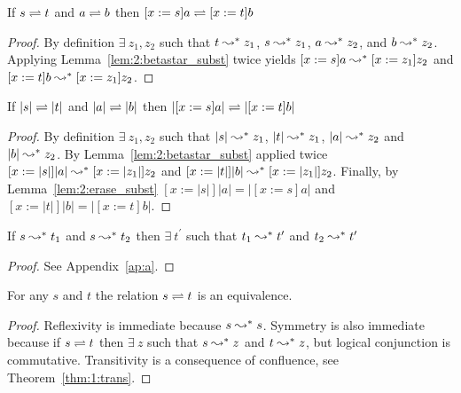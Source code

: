 \begin{lemma}
    If $s \rightleftharpoons t$ and $a \rightleftharpoons b$ then $[x := s]a \rightleftharpoons [x := t]b$
    \label{lem:2:betaconv_subst}
\end{lemma}
\begin{proof}
    By definition $\exists\ z_1, z_2$ such that $t \leadsto^* z_1$, $s \leadsto^* z_1$, $a \leadsto^* z_2$, and $b \leadsto^* z_2$.
    Applying Lemma~\ref{lem:2:betastar_subst} twice yields $[x := s]a \leadsto^* [x := z_1]z_2$ and $[x := t]b \leadsto^* [x := z_1]z_2$.
\end{proof}

\begin{lemma}
    If $|s| \rightleftharpoons |t|$ and $|a| \rightleftharpoons |b|$ then $|[x := s]a| \rightleftharpoons |[x := t]b|$
    \label{lem:2:betaconv_erased_subst}
\end{lemma}
\begin{proof}
    By definition $\exists\ z_1, z_2$ such that $|s| \leadsto^* z_1$, $|t| \leadsto^* z_1$, $|a| \leadsto^* z_2$ and $|b| \leadsto^* z_2$.
    By Lemma~\ref{lem:2:betastar_subst} applied twice $[x := |s|]|a| \leadsto^* [x := |z_1|]z_2$ and $[x := |t|]|b| \leadsto^* [x := |z_1|]z_2$.
    Finally, by Lemma~\ref{lem:2:erase_subst} $[x := |s|]|a| = |[x := s]a|$ and $[x := |t|]|b| = |[x := t]b|$.
\end{proof}








\begin{lemma}[Confluence]
    If $s \leadsto^* t_1$ and $s \leadsto^* t_2$ then $\exists\ t^\prime$ such that $t_1 \leadsto^* t^\prime$ and $t_2 \leadsto^* t^\prime$
\end{lemma}
\begin{proof}
    See Appendix~\ref{ap:a}.
\end{proof}

\begin{lemma}
    For any $s$ and $t$ the relation $s \rightleftharpoons t$ is an equivalence.
    \label{lem:2:beta_conv_equivalence}
\end{lemma}
\begin{proof}
    Reflexivity is immediate because $s \leadsto^* s$.
    Symmetry is also immediate because if $s \rightleftharpoons t$ then $\exists\ z$ such that $s \leadsto^* z$ and $t \leadsto^* z$, but logical conjunction is commutative.
    Transitivity is a consequence of confluence, see Theorem~\ref{thm:1:trans}.
\end{proof}

